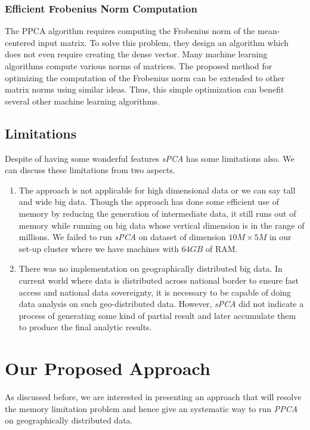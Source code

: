 \documentclass[10pt,conference,letterpaper]{IEEEtran}
\begin{document}
\subsubsection{Efficient Frobenius Norm Computation}
The PPCA algorithm requires computing the Frobenius norm of the mean-centered input matrix. To solve this problem, they design an algorithm which does not even require creating the dense vector. Many machine learning algorithms compute various norms of matrices. The proposed method for optimizing the computation of the Frobenius norm can be extended to other matrix norms using similar ideas. Thus, this simple optimization can benefit several other machine learning algorithms.
\subsection{Limitations}
Despite of having some wonderful features \textit{sPCA} has some limitations also. We can discuss these limitations from two aspects.

\begin{enumerate}
\item The approach is not applicable for high dimensional data or we can say tall and wide big data. Though the approach has done some efficient use of memory by reducing the generation of intermediate data, it still runs out of memory while running on big data whose vertical dimension is in the range of millions. We failed to run \textit{sPCA} on dataset of dimension $10M\times5M$ in our set-up cluster where we have machines with $64GB$ of RAM.\\   

\item There was no implementation on geographically distributed big data. In current world where data is distributed across national border to ensure fast access and national data sovereignty, it is necessary to be capable of doing data analysis on such geo-distributed data. However, \textit{sPCA} did not indicate a process of generating some kind of partial result and later accumulate them to produce the final analytic results.
\end{enumerate}

\section{Our Proposed Approach}
As discussed before, we are interested in presenting an approach that will resolve the memory limitation problem and hence give an systematic way to run \emph{PPCA} on geographically distributed data. 
\end{document}

